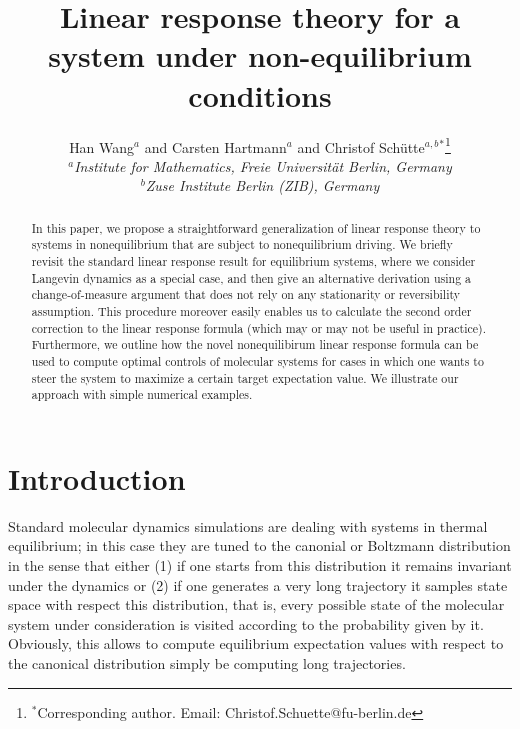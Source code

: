 \documentclass[]{tMPH2e}
\begin{document}
\title{Linear response theory for a system under non-equilibrium conditions}

\author{Han Wang$^{a}$ and Carsten Hartmann$^{a}$ and Christof Sch\"utte$^{a,b}$$^{\ast}$\thanks{$^\ast$Corresponding author. Email: Christof.Schuette@fu-berlin.de}\\\vspace{6pt}$^{a}${\em Institute for Mathematics, Freie Universit\"at Berlin, Germany}\\$^{b}${\em Zuse Institute Berlin (ZIB), Germany}}
  


\maketitle

\begin{abstract}
  In this paper, we propose a straightforward generalization of linear response theory to systems in nonequilibrium that are subject to nonequilibrium driving. 
  We briefly revisit the standard linear response result for equilibrium systems, where we consider Langevin dynamics as a special case, and then give an alternative derivation using a change-of-measure argument that does not rely on any stationarity or reversibility assumption. This procedure moreover easily enables us to calculate the second order correction to the linear response formula (which may or may not be useful in practice). Furthermore, we outline how the novel nonequilibirum linear response formula can be used to compute optimal controls of molecular systems for cases in which one wants to steer the system to maximize a certain target expectation value. We illustrate our approach with simple numerical examples. 
\end{abstract}


\section{Introduction}

Standard molecular dynamics simulations are dealing with systems in thermal equilibrium; in this case they are tuned to the canonial or Boltzmann distribution in the sense that either (1) if one starts from this distribution it remains invariant under the dynamics or (2) if one generates a very long trajectory it samples state space with respect this distribution, that is, every possible state of the molecular system under consideration is visited according to the probability given by it.  Obviously, this allows to compute equilibrium expectation values with respect to the  canonical distribution simply be computing long trajectories. 
\end{document}
